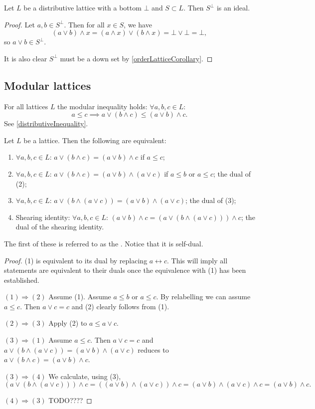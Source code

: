 \begin{lemma} \label{disjointComplementIdeal}
Let $L$ be a distributive lattice with a bottom $\bot$ and $S\subset L$. Then $S^\perp$ is an ideal.
\end{lemma}
\begin{proof}
Let $a,b\in S^\perp$. Then for all $x\in S$, we have
\[ (a\vee b)\wedge x = (a\wedge x)\vee (b\wedge x) = \bot\vee \bot = \bot, \]
so $a\vee b\in S^\perp$.

It is also clear $S^\perp$ must be a down set by \ref{orderLatticeCorollary}.
\end{proof}

\subsection{Modular lattices}
For all lattices $L$ the modular inequality holds: $\forall a,b,c \in L$:
\[ a\leq c \implies a \vee (b\wedge c) \leq (a\vee b) \wedge c. \]
See \ref{distributiveInequality}.

\begin{proposition} \label{modularEquivalences}
Let $L$ be a lattice. Then the following are equivalent:
\begin{enumerate}
\item $\forall a,b,c\in L$: $a \vee (b\wedge c) = (a\vee b) \wedge c$ if $a\leq c$;
\item $\forall a,b,c\in L$: $a \vee (b\wedge c) = (a\vee b) \wedge (a\vee c)$ if $a\leq b$ or $a\leq c$; the dual of (2);
\item $\forall a,b,c\in L$: $a\vee (b\wedge (a\vee c)) = (a\vee b)\wedge (a\vee c)$; the dual of (3);
\item \textup{Shearing identity}: $\forall a,b,c\in L$: $(a\vee b) \wedge c = (a\vee (b\wedge (a\vee c)))\wedge c$; the dual of the shearing identity.
\end{enumerate}
\end{proposition}
The first of these is referred to as the . Notice that it is self-dual.
\begin{proof}
(1) is equivalent to its dual by replacing $a\leftrightarrow c$. This will imply all statements are equivalent to their duals once the equivalence with (1) has been established. 

$\boxed{(1)\Rightarrow (2)}$ Assume (1). Assume $a\leq b$ or $a\leq c$. By relabelling we can assume $a\leq c$.  Then $a\vee c = c$ and (2) clearly follows from (1).


$\boxed{(2)\Rightarrow (3)}$ Apply (2) to $a\leq a\vee c$.

$\boxed{(3)\Rightarrow (1)}$ Assume $a\leq c$. Then $a\vee c = c$ and $a\vee (b\wedge (a\vee c)) = (a\vee b)\wedge (a\vee c)$ reduces to $a \vee (b\wedge c) = (a\vee b) \wedge c$.

$\boxed{(3)\Rightarrow (4)}$ We calculate, using (3),
\[ (a\vee (b\wedge (a\vee c)))\wedge c = ((a\vee b)\wedge (a\vee c))\wedge c = (a\vee b) \wedge (a\vee c) \wedge c = (a\vee b) \wedge c. \]

$\boxed{(4)\Rightarrow (3)}$ TODO????
\end{proof}

